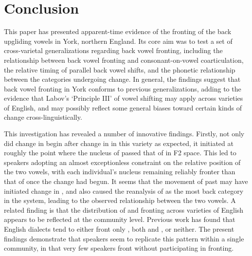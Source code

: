 \documentclass[12pt]{article}
\begin{document}
\section{Conclusion}

This paper has presented apparent-time evidence of the fronting of the back upgliding vowels in York, northern England. Its core aim was to test a set of cross-varietal generalizations regarding back vowel fronting, including the relationship between back vowel fronting and consonant-on-vowel coarticulation, the relative timing of parallel back vowel shifts, and the phonetic relationship between the categories undergoing change. In general, the findings suggest that back vowel fronting in York conforms to previous generalizations, adding to the evidence that Labov's `Principle III' of vowel shifting may apply across varieties of English, and may possibly reflect some general biases toward certain kinds of change cross-linguistically. 

This investigation has revealed a number of innovative findings. Firstly, not only did change in  begin after change in  in this variety as expected, it initiated at roughly the point where the nucleus of  passed that of  in F2 space. This led to speakers adopting an almost exceptionless constraint on the relative position of the two vowels, with each individual's  nucleus remaining reliably fronter than that of  once the change had begun. It seems that the movement of  past  may have initiated change in , and also caused the reanalysis of  as the most back category in the system, leading to the observed relationship between the two vowels. A related finding is that the distribution of  and  fronting across varieties of English appears to be reflected at the community level. Previous work has found that English dialects tend to either front only , both  and , or neither. The present findings demonstrate that speakers seem to replicate this pattern within a single community, in that very few speakers front  without participating in  fronting.
\end{document}
